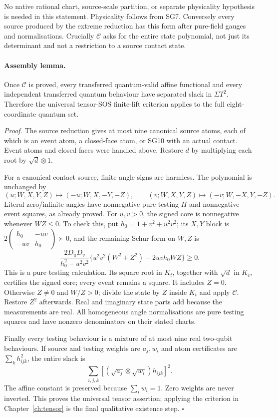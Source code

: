 No native rational chart, source-scale partition, or separate
physicality hypothesis is needed in this statement.  Physicality
follows from SG7.  Conversely every source produced by the extreme
reduction has this form after pure-field gauges and normalisations.
Crucially $\mathcal C$ asks for the entire state polynomial, not just
its determinant and not a restriction to a source contact state.

\paragraph{Assembly lemma.}
Once $\mathcal C$ is proved, every transferred quantum-valid affine
functional and every independent transferred quantum behaviour
have separated slack in $\Sigma T^2$.  Therefore the universal
tensor-SOS finite-lift criterion applies to the full eight-coordinate
quantum set.

\emph{Proof.}
The source reduction gives at most nine canonical source atoms,
each of which is an event atom, a closed-face atom, or SG10 with
an actual contact.  Event atoms and closed faces were handled above.
Restore $d$ by multiplying each root by $\sqrt d\otimes1$.

For a canonical contact source, finite angle signs are harmless.
The polynomial is unchanged by
\[
 (u;W,X,Y,Z)\mapsto(-u;W,X,-Y,-Z),\qquad
 (v;W,X,Y,Z)\mapsto(-v;W,-X,Y,-Z).
\]
Literal zero/infinite angles have nonnegative pure-testing $H$ and
nonnegative event squares, as already proved.  For $u,v>0$, the
signed core is nonnegative whenever $WZ\leq0$.  To check this,
put $h_0=1+v^2+u^2v^2$; its $X,Y$ block is
$2\left(\begin{smallmatrix}h_0&-uv\\-uv&h_0\end{smallmatrix}\right)
\succ0$, and the remaining Schur form on $W,Z$ is
\[
 \frac{2D_uD_v}{h_0^2-u^2v^2}
 \{u^2v^2(W^2+Z^2)-2uvh_0WZ\}\geq0.                 \tag{SG15}
\]
This is a pure testing calculation.  Its square root in $K_t$,
together with $\sqrt d$ in $K_c$, certifies the signed core;
every event remains a square.  It includes $Z=0$.
Otherwise $Z\ne0$ and $W/Z>0$; divide the state by $Z$ inside
$K_t$ and apply $\mathcal C$.  Restore $Z^2$ afterwards.
Real and imaginary state parts add because the measurements are
real.  All homogeneous angle normalisations are pure testing
squares and have nonzero denominators on their stated charts.

Finally every testing behaviour is a mixture of at most nine real
two-qubit behaviours.  If source and testing weights are $a_j,w_i$
and atom certificates are $\sum_kh_{ijk}^2$, the entire slack is
\[
       \sum_{i,j,k}
           [ (\sqrt{a_j}\otimes\sqrt{w_i})h_{ijk}]^2.
\]
The affine constant is preserved because $\sum_iw_i=1$.
Zero weights are never inverted.  This proves the universal tensor
assertion; applying the criterion in Chapter~\ref{ch:tensor} is the final
qualitative existence step. \hfill$\square$

